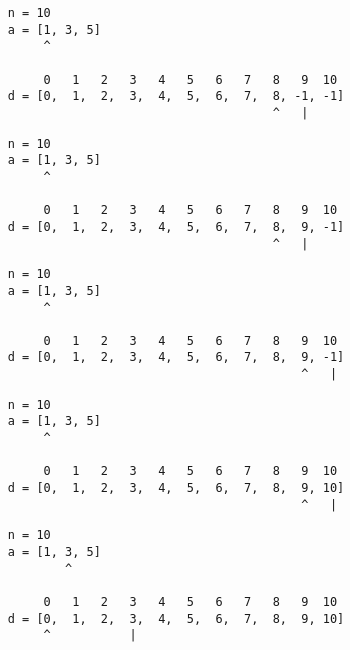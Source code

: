 \begin{frame}[fragile]
\begin{verbatim}
     n = 10
     a = [1, 3, 5]
          ^

          0   1   2   3   4   5   6   7   8   9  10
     d = [0,  1,  2,  3,  4,  5,  6,  7,  8, -1, -1]
                                          ^   |
\end{verbatim}
\end{frame}
\addtocounter{framenumber}{-1}

\begin{frame}[fragile]
\begin{verbatim}
     n = 10
     a = [1, 3, 5]
          ^

          0   1   2   3   4   5   6   7   8   9  10
     d = [0,  1,  2,  3,  4,  5,  6,  7,  8,  9, -1]
                                          ^   |
\end{verbatim}
\end{frame}
\addtocounter{framenumber}{-1}

\begin{frame}[fragile]
\begin{verbatim}
     n = 10
     a = [1, 3, 5]
          ^

          0   1   2   3   4   5   6   7   8   9  10
     d = [0,  1,  2,  3,  4,  5,  6,  7,  8,  9, -1]
                                              ^   |
\end{verbatim}
\end{frame}
\addtocounter{framenumber}{-1}

\begin{frame}[fragile]
\begin{verbatim}
     n = 10
     a = [1, 3, 5]
          ^

          0   1   2   3   4   5   6   7   8   9  10
     d = [0,  1,  2,  3,  4,  5,  6,  7,  8,  9, 10]
                                              ^   |
\end{verbatim}
\end{frame}
\addtocounter{framenumber}{-1}

\begin{frame}[fragile]
\begin{verbatim}
     n = 10
     a = [1, 3, 5]
             ^

          0   1   2   3   4   5   6   7   8   9  10
     d = [0,  1,  2,  3,  4,  5,  6,  7,  8,  9, 10]
          ^           |
\end{verbatim}
\end{frame}
\addtocounter{framenumber}{-1}


